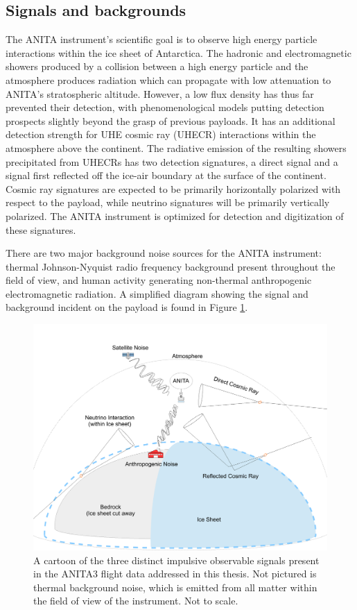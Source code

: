	\subsection{Signals and backgrounds}
	The ANITA instrument's scientific goal is to observe high energy particle interactions within the ice sheet of Antarctica.  The hadronic and electromagnetic showers produced by a collision between a high energy particle and the atmosphere produces radiation which can propagate with low attenuation to ANITA's stratospheric altitude. However, a low flux density has thus far prevented their detection, with phenomenological models putting detection prospects slightly beyond the grasp of previous payloads.  It has an additional detection strength for UHE cosmic ray (UHECR) interactions within the atmosphere above the continent.  The radiative emission of the resulting showers precipitated from UHECRs has two detection signatures, a direct signal and a signal first reflected off the ice-air boundary at the surface of the continent.  Cosmic ray signatures are expected to be primarily horizontally polarized with respect to the payload, while neutrino signatures will be primarily vertically polarized.  The ANITA instrument is optimized for detection and digitization of these signatures.
	
	There are two major background noise sources for the ANITA instrument: thermal Johnson-Nyquist radio frequency background present throughout the field of view, and human activity generating non-thermal anthropogenic electromagnetic radiation.  A simplified diagram showing the signal and background incident on the payload is found in Figure \ref{fig:AnitaInFlightObservable}.
	
\begin{figure}
\centering
	\includegraphics[width=\textwidth]{figures/AnitaInFlightObservable2}
	\caption{A cartoon of the three distinct impulsive observable signals present in the ANITA3 flight data addressed in this thesis. Not pictured is thermal background noise, which is emitted from all matter within the field of view of the instrument.  Not to scale. }
	\label{fig:AnitaInFlightObservable}
\end{figure}	

